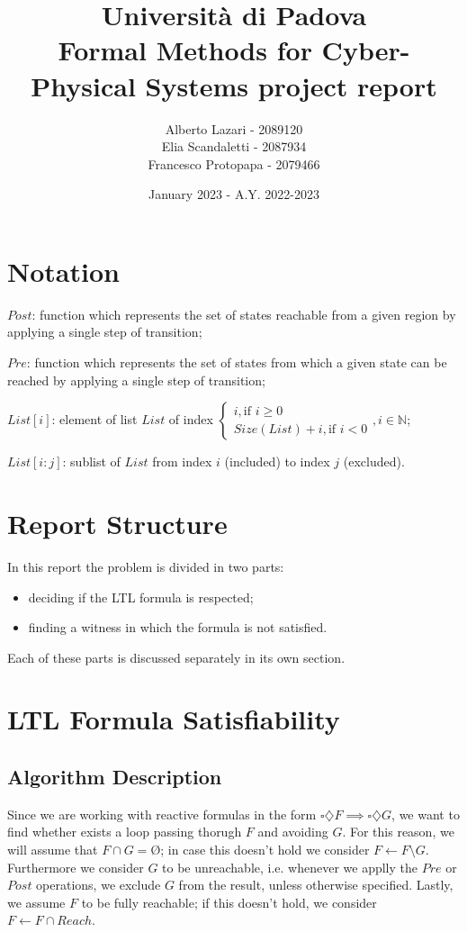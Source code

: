 \documentclass[12pt]{article}
\title{\textbf{Università di Padova \\ Formal Methods for Cyber-Physical Systems project report}}
\author{Alberto Lazari - 2089120 \\ Elia Scandaletti - 2087934 \\ Francesco Protopapa - 2079466 \\}
\date{January 2023 - A.Y. 2022-2023}
\newcommand{\nothing}{\text{\O}}
\begin{document}
    \maketitle
    \pagebreak

    \tableofcontents
    \pagebreak

    \section{Notation}
    \begin{description}
        \item $Post$: function which represents the set of states reachable from a given region by applying a single step of transition;
        \item $Pre$: function which represents the set of states from which a given state can be reached by applying a single step of transition;
        \item $List[i]$: element of list $List$ of index $
        \begin{cases}
            i, \mbox{if } i \geq 0 \\
            Size(List) + i, \mbox{if } i < 0
        \end{cases}, i \in \mathbb N$;
        \item $List[i:j]$: sublist of $List$ from index $i$ (included) to index $j$ (excluded). 
    \end{description}

    \section{Report Structure}
    In this report the problem is divided in two parts:
    \begin{itemize}
        \item deciding if the LTL formula is respected; 
        \item finding a witness in which the formula is not satisfied.
    \end{itemize}
    Each of these parts is discussed separately in its own section.

    \section{LTL Formula Satisfiability}
    \subsection{Algorithm Description}
    Since we are working with reactive formulas in the form $\square \diamondsuit F \implies \square \diamondsuit G$, we want to find whether exists a loop passing thorugh $F$ and avoiding $G$.
    For this reason, we will assume that $F \cap G = \nothing$; in case this doesn't hold we consider $F \leftarrow F \setminus G$.
    Furthermore we consider $G$ to be unreachable, i.e. whenever we applly the $Pre$ or $Post$ operations, we exclude $G$ from the result, unless otherwise specified.
    Lastly, we assume $F$ to be fully reachable; if this doesn't hold, we consider $F \leftarrow F \cap Reach$.
\end{document}
